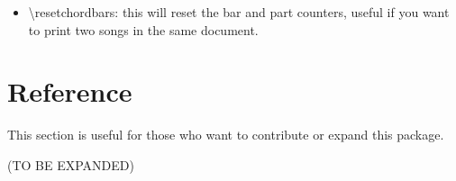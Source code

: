 \documentclass[11pt]{article}
\begin{document}
\begin{itemize}
\noindent
\begin{minipage}{0.45\textwidth}

\end{minipage}
%
\begin{minipage}{0.42\textwidth}

\end{minipage}






\item {\ttfamily \textbackslash resetchordbars}: this will reset the bar and part counters, useful if you want to print two songs in the same document.
\end{itemize}


\section{Reference}

This section is useful for those who want to contribute or expand this package.

(TO BE EXPANDED)
\end{document}
